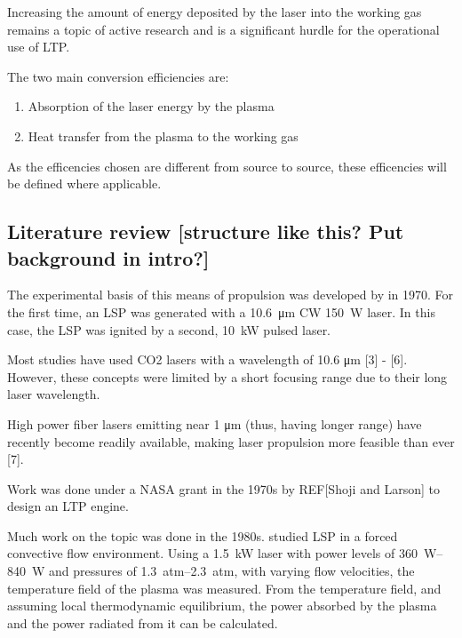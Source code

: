 
    Increasing the amount of energy deposited by the laser into the working gas remains a topic of active research and is a significant hurdle for the operational use of LTP.


        The two main conversion efficiencies are:
        \begin{enumerate}
            \item Absorption of the laser energy by the plasma
            \item Heat transfer from the plasma to the working gas
        \end{enumerate}

    As the efficencies chosen are different from source to source, these efficencies will be defined where applicable.

    \subsection{Literature review [structure like this? Put background in intro?]}
    

    The experimental basis of this means of propulsion was developed by \textcite{generalovContinuousOpticalDischarge1970} in 1970. For the first time, an LSP was generated with a \qty{10.6}{μm} CW  \qty{150}{W} laser. In this case, the LSP was ignited by a second, \qty{10}{kW} pulsed  laser.
    
    Most studies have used CO2 lasers with a wavelength of 10.6 μm [3] - [6]. However, these concepts were limited by a short focusing range due to their long laser wavelength. 
    
    High power fiber lasers emitting near 1 μm (thus, having longer range) have recently become readily available, making laser propulsion more feasible than ever [7].

    

        Work was done under a NASA grant in the 1970s by REF[Shoji and Larson] to design an LTP engine. 


        
        

        Much work on the topic was done in the 1980s. \textcite{keeferPowerAbsorptionLasersustained1986a} studied LSP in a forced convective flow environment. Using a \qty{1.5}{kW}  laser with power levels of \qtyrange{360}{840}{W} and pressures of \qtyrange{1.3}{2.3}{atm}, with varying flow velocities, the temperature field of the plasma was measured. From the temperature field, and assuming local thermodynamic equilibrium, the power absorbed by the plasma and the power radiated from it can be calculated.

